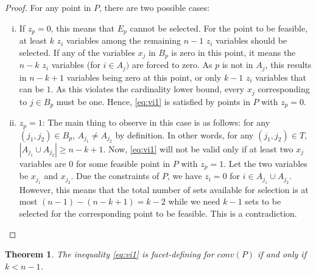 \documentclass[12pt]{article}
\newtheorem{thm}{Theorem}
\begin{document}
\begin{proof}
For any point in $P$, there are two possible cases:

\begin{enumerate}[(i)]
\item If $z_p = 0$, this means that $E_p$ cannot be selected. For the point to be feasible, at least $k$ $z_i$ variables among the remaining $n-1$ $z_i$ variables should be selected. If any of the variables $x_j$ in $B_p$ is zero in this point, it means the $n-k$ $z_i$ variables (for $i \in A_j)$ are forced to zero. As $p$ is not in $A_j$, this results in $n-k+1$ variables being zero at this point, or only $k-1$ $z_i$ variables that can be $1$. As this violates the cardinality lower bound, every $x_j$ corresponding to $j \in B_p$ must be one. Hence, \eqref{eq:vi1} is satisfied by points in $P$ with $z_p=0$.

\item $z_p = 1$: The main thing to observe in this case is as follows: for any $(j_1,j_2) \in B_p$, $A_{j_1} \neq A_{j_2}$ by definition. In other words, for any $(j_1,j_2) \in T$, $|A_{j_1} \cup A_{j_2}| \geq n-k+1$. Now, \eqref{eq:vi1} will not be valid only if at least two $x_j$ variables are $0$ for some feasible point in $P$ with $z_p = 1$. Let the two variables be $x_{j_1}$ and $x_{j_2}$. Due the constraints of $P$, we have $z_i = 0$ for $i \in A_{j_1} \cup A_{j_2}$. However, this means that the total number of sets available for selection is at most $(n-1) - (n-k+1) = k-2$ while we need $k-1$ sets to be selected for the corresponding point to be feasible. This is a contradiction.
\end{enumerate}
\end{proof}

\begin{thm}
The inequality \eqref{eq:vi1} is facet-defining for $conv(P)$ if and only if $k<n-1$.
\end{thm}
\end{document}
